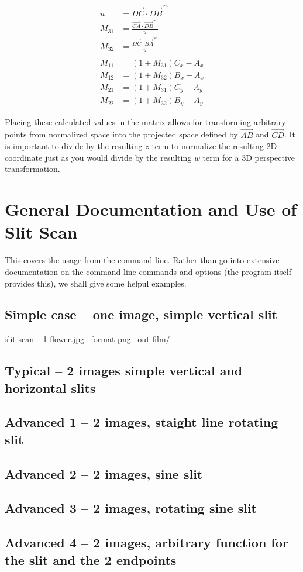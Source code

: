 \documentclass[letterpaper, 11pt]{article}
\begin{document}
\begin{enumerate}
\begin{align}
u &= \overrightarrow{DC} \cdot \overrightarrow{DB}^{\curvearrowleft} \\
M_{31} &= \frac{\overrightarrow{CA} \cdot \overrightarrow{DB}^{\curvearrowleft}}{u} \\
M_{32} &= \frac{\overrightarrow{DC} \cdot \overrightarrow{BA}^{\curvearrowleft}}{u} \\ \\
M_{11} &= (1 + M_{31})C_x - A_x \\
M_{12} &= (1 + M_{32})B_x - A_x \\
M_{21} &= (1 + M_{31})C_y - A_y \\
M_{22} &= (1 + M_{32})B_y - A_y
\end{align}

Placing these calculated values in the matrix allows for
transforming arbitrary points from normalized space into 
the projected space defined by \(\overrightarrow{AB}\) and \(\overrightarrow{CD}\).
It is important to divide by the resulting \(z\) term to normalize the resulting 2D
coordinate just as you would divide by the resulting \(w\) term for a 
3D perspective transformation.
$$
\end{enumerate}

\section{General Documentation and Use of Slit Scan}
\label{sec:org1a85532}
This covers the usage from the command-line. Rather than go into extensive documentation
on the command-line commands and options (the program itself provides this), we shall
give some helpul examples.
\subsection{Simple case -- one image, simple vertical slit}
\label{sec:org3b81f99}
slit-scan --i1 flower.jpg --format png --out film/

\subsection{Typical -- 2 images simple vertical and horizontal slits}
\label{sec:orgf1f2667}
\subsection{Advanced 1 -- 2 images, staight line rotating slit}
\label{sec:orgccbf377}
\subsection{Advanced 2 -- 2 images, sine slit}
\label{sec:org927fc8e}
\subsection{Advanced 3 -- 2 images, rotating sine slit}
\label{sec:orge9d3c1d}
\subsection{Advanced 4 -- 2 images, arbitrary function for the slit and the 2 endpoints}
\label{sec:org40844ec}
\end{document}
